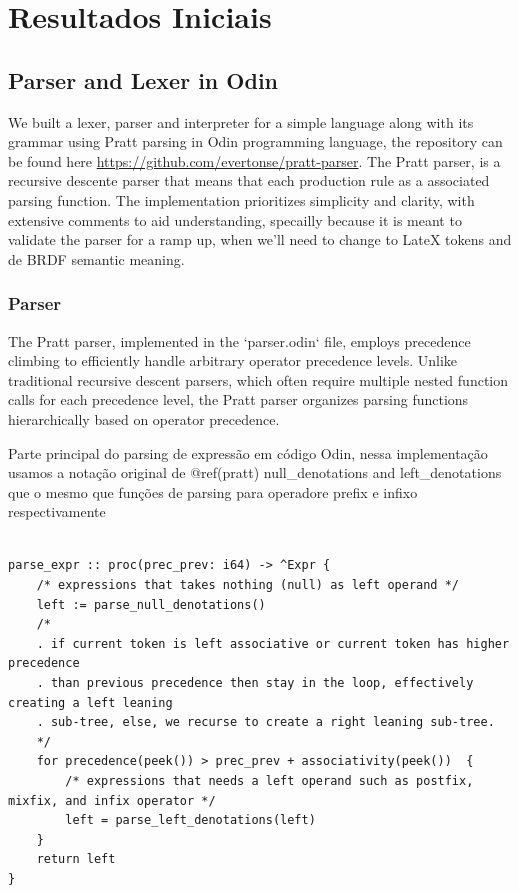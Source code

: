 \documentclass[english, 
               brazil, 
               bsc] %
               {dcomp-abntex2}
\begin{document}
\chapter{Resultados Iniciais}

\section{Parser and Lexer in Odin}

We built a lexer, parser and interpreter for a  simple language along with its grammar using Pratt parsing in Odin programming language, the repository can be found here \url{https://github.com/evertonse/pratt-parser}. The Pratt parser, is a recursive descente parser that means that each production rule as a associated parsing function. The implementation prioritizes simplicity and clarity, with extensive comments to aid understanding, specailly because it is meant to validate the parser for a ramp up, when we'll need to change to LateX tokens and de BRDF semantic meaning.

\subsection{Parser}

The Pratt parser, implemented in the `parser.odin` file, employs precedence climbing to efficiently handle arbitrary operator precedence levels. Unlike traditional recursive descent parsers, which often require multiple nested function calls for each precedence level, the Pratt parser organizes parsing functions hierarchically based on operator precedence.



\begin{algoritmo}[H]
  \caption{Parte principal do parsing de expressão em código Odin, nessa implementação usamos a notação original de @ref(pratt) null\_denotations and left\_denotations que o mesmo que funções de parsing para operadore prefix e infixo respectivamente}
	\label{alg1}
	\label{alg1}
  \begin{lstlisting}

parse_expr :: proc(prec_prev: i64) -> ^Expr {
    /* expressions that takes nothing (null) as left operand */
    left := parse_null_denotations() 
    /*
    . if current token is left associative or current token has higher precedence
    . than previous precedence then stay in the loop, effectively creating a left leaning
    . sub-tree, else, we recurse to create a right leaning sub-tree.
    */
    for precedence(peek()) > prec_prev + associativity(peek())  {
        /* expressions that needs a left operand such as postfix, mixfix, and infix operator */
        left = parse_left_denotations(left)
    }
    return left
}

  \end{lstlisting}
\end{algoritmo}
\end{document}
